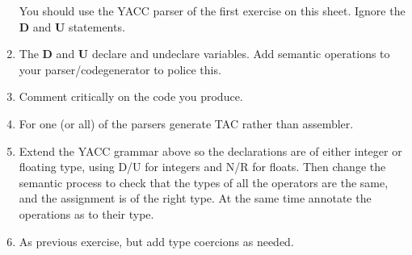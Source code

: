 \begin{enumerate}
You should use the YACC parser of the first exercise on this sheet.
Ignore the {\bf D} and {\bf U} statements.

\item
 The {\bf D} and {\bf U} declare and undeclare variables.  Add
 semantic operations to your parser/codegenerator to police this.

\item Comment critically on the code you produce.

\item For one (or all) of the parsers generate TAC rather than assembler.

\item Extend the YACC grammar above so the declarations are of either
  integer or floating type, using D/U for integers and N/R for floats.
  Then change the semantic process to check that the types of all the
  operators are the same, and the assignment is of the right type.  At
  the same time annotate the operations as to their type.

\item As previous exercise, but add type coercions as needed.

\end{enumerate}



